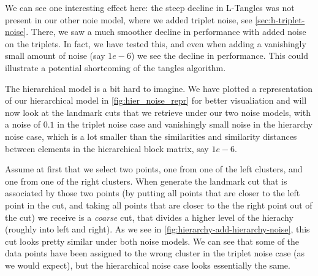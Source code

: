 We can see one interesting effect here: the steep decline in L-Tangles was not present in our other noie model, where we added triplet noise, see \autoref{sec:h-triplet-noise}.
There, we saw a much smoother decline in performance with added noise on the triplets. In fact, we have tested this, and even when adding a vanishingly small amount of noise (say $1e-6$) we
see the decline in performance. This could illustrate a potential shortcoming of the tangles algorithm.

The hierarchical model is a bit hard to imagine.  We have plotted a representation of our hierarchical model in \autoref{fig:hier_noise_repr} for better visualiation
and will now look at the landmark cuts that we retrieve under our two noise models, with a noise of $0.1$ in the triplet noise case and vanishingly small noise in
the hierarchy noise case, which is a lot smaller than the similarities and similarity distances between elements in the hierarchical block matrix, say $1e-6$.

Assume at first that we select two points, one from one of the left clusters, and one from one of the right clusters. When generate the landmark cut that is associated by those two points
(by putting all points that are closer to the left point in the cut, and taking all points that are closer to the the right point out of the cut) we receive is a \textit{coarse} cut, that divides
a higher level of the hierachy (roughly into left and right). As we see in \autoref{fig:hierarchy-add-hierarchy-noise}, this cut looks pretty similar under both noise models. 
We can see that some of the data points have been assigned to the wrong cluster in the triplet noise case (as we would expect), but the hierarchical noise case looks essentially the same.

